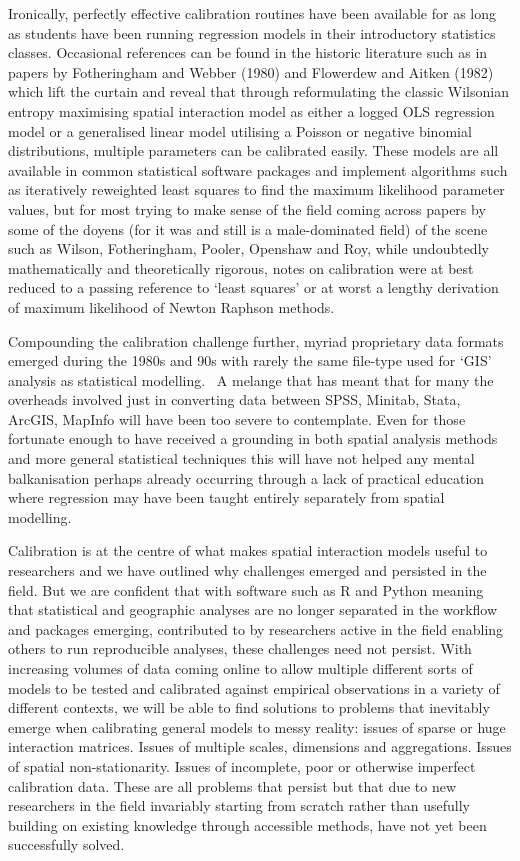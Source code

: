 \documentclass[11pt,letterpaper]{article}
\begin{document}
Ironically, perfectly effective calibration routines have been available for as long as students have been running regression models in their introductory statistics classes.
Occasional references can be found in the historic literature such as in papers by Fotheringham and Webber (1980) and Flowerdew and Aitken (1982) which lift the curtain and reveal that through reformulating the classic Wilsonian entropy maximising spatial interaction model as either a logged OLS regression model or a generalised linear model utilising a Poisson or negative binomial distributions, multiple parameters can be calibrated easily.
These models are all available in common statistical software packages and implement algorithms such as iteratively reweighted least squares to find the maximum likelihood parameter values, but for most trying to make sense of the field coming across papers by some of the doyens (for it was and still is a male-dominated field) of the scene such as Wilson, Fotheringham, Pooler, Openshaw and Roy, while undoubtedly mathematically and theoretically rigorous, notes on calibration were at best reduced to a passing reference to `least squares' or at worst a lengthy derivation of maximum likelihood of Newton Raphson methods.

Compounding the calibration challenge further, myriad proprietary data formats emerged during the 1980s and 90s with rarely the same file-type used for `GIS' analysis as statistical modelling.
~A melange that has meant that for many the overheads involved just in converting data between SPSS, Minitab, Stata, ArcGIS, MapInfo will have been too severe to contemplate.
Even for those fortunate enough to have received a grounding in both spatial analysis methods and more general statistical techniques this will have not helped any mental balkanisation perhaps already occurring through a lack of practical education where regression may have been taught entirely separately from spatial modelling.

Calibration is at the centre of what makes spatial interaction models useful to researchers and we have outlined why challenges emerged and persisted in the field.
But we are confident that with software such as R and Python meaning that statistical and geographic analyses are no longer separated in the workflow and packages emerging, contributed to by researchers active in the field enabling others to run reproducible analyses, these challenges need not persist.
With increasing volumes of data coming online to allow multiple different sorts of models to be tested and calibrated against empirical observations in a variety of different contexts, we will be able to find solutions to problems that inevitably emerge when calibrating general models to messy reality: issues of sparse or huge interaction matrices.
Issues of multiple scales, dimensions and aggregations.
Issues of spatial non-stationarity.
Issues of incomplete, poor or otherwise imperfect calibration data.
These are all problems that persist but that due to new researchers in the field invariably starting from scratch rather than usefully building on existing knowledge through accessible methods, have not yet been successfully solved.
\end{document}
